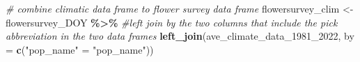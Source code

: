 \documentclass[
]{article}
\newenvironment{Shaded}{\begin{snugshade}}{\end{snugshade}}
\newcommand{\AttributeTok}[1]{\textcolor[rgb]{0.13,0.29,0.53}{#1}}
\newcommand{\CommentTok}[1]{\textcolor[rgb]{0.56,0.35,0.01}{\textit{#1}}}
\newcommand{\FunctionTok}[1]{\textcolor[rgb]{0.13,0.29,0.53}{\textbf{#1}}}
\newcommand{\NormalTok}[1]{#1}
\newcommand{\OtherTok}[1]{\textcolor[rgb]{0.56,0.35,0.01}{#1}}
\newcommand{\SpecialCharTok}[1]{\textcolor[rgb]{0.81,0.36,0.00}{\textbf{#1}}}
\newcommand{\StringTok}[1]{\textcolor[rgb]{0.31,0.60,0.02}{#1}}
\begin{document}
\begin{Shaded}
\begin{Highlighting}[]
\CommentTok{\# combine climatic data frame to flower survey data frame}
\NormalTok{flowersurvey\_clim }\OtherTok{\textless{}{-}}\NormalTok{ flowersurvey\_DOY }\SpecialCharTok{\%\textgreater{}\%}
  \CommentTok{\#left join by the two columns that include the pick abbreviation in the two data frames}
  \FunctionTok{left\_join}\NormalTok{(ave\_climate\_data\_1981\_2022, }\AttributeTok{by =} \FunctionTok{c}\NormalTok{(}\StringTok{"pop\_name"} \OtherTok{=} \StringTok{"pop\_name"}\NormalTok{))}
\end{Highlighting}
\end{Shaded}
\end{document}
